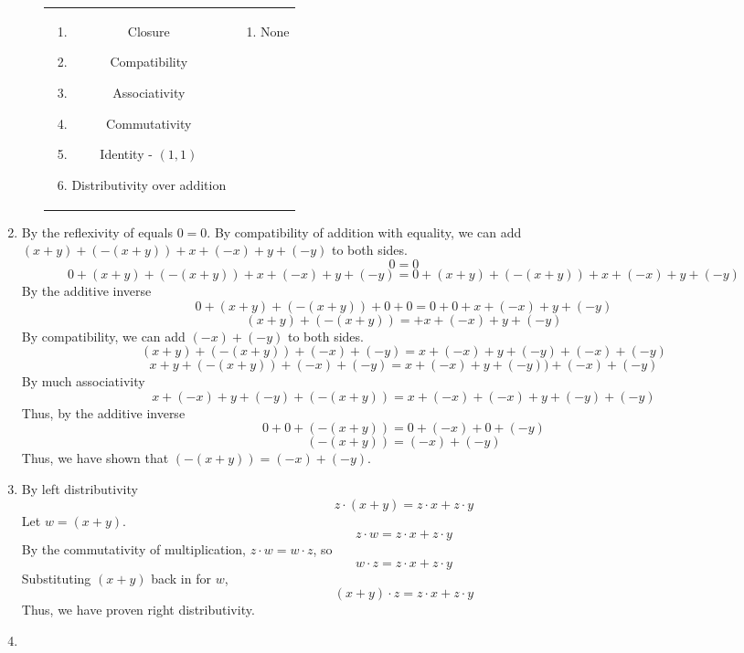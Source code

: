 \documentclass{article}
\begin{document}
\begin{enumerate}[label=\textbf{\arabic*}.]
\begin{enumerate}[label=\textbf{\alph*}.]
\begin{tabular}{c|c}
        \begin{minipage}{0.425\textwidth}
            \begin{enumerate}[label=-, itemsep=-3pt]
                \item Closure
                \item Compatibility
                \item Associativity
                \item Commutativity
                \item Identity - $(1,1)$
                \item Distributivity over addition
            \end{enumerate}
        \end{minipage}
        &
        \begin{minipage}{0.425\textwidth}
            \begin{enumerate}[label=-, itemsep=-3pt]
                \item None
            \end{enumerate}
        \end{minipage}
        \end{tabular}
    \end{enumerate}
    \item 
        By the reflexivity of equals $0=0$. By compatibility of addition with equality, we can add $(x+y)+(-(x+y))+x+(-x)+y+(-y)$ to both sides.
        \[0=0\]
        \[0+(x+y)+(-(x+y))+x+(-x)+y+(-y)=0+(x+y)+(-(x+y))+x+(-x)+y+(-y)\]
        By the additive inverse
        \[0+(x+y)+(-(x+y))+0+0=0+0+x+(-x)+y+(-y)\]
        \[(x+y)+(-(x+y))=+x+(-x)+y+(-y)\]
        By compatibility, we can add $(-x)+(-y)$ to both sides.
        \[(x+y)+(-(x+y))+(-x)+(-y)=x+(-x)+y+(-y)+(-x)+(-y)\]
        \[x+y+(-(x+y))+(-x)+(-y)=x+(-x)+y+(-y))+(-x)+(-y)\]
        By much associativity
        \[x+(-x)+y+(-y)+(-(x+y))=x+(-x)+(-x)+y+(-y)+(-y)\]
        Thus, by the additive inverse
        \[0+0+(-(x+y))=0+(-x)+0+(-y)\]
        \[(-(x+y))=(-x)+(-y)\]
        Thus, we have shown that $(-(x+y))=(-x)+(-y)$.
    \item By left distributivity
        \[z \cdot (x+y)=z \cdot x + z \cdot y\]
        Let $w=(x+y)$.
        \[z \cdot w=z \cdot x + z \cdot y\]
        By the commutativity of multiplication, $z \cdot w = w \cdot z$, so
        \[w \cdot z=z \cdot x + z \cdot y\]
        Substituting $(x+y)$ back in for $w$,
        \[(x+y) \cdot z=z \cdot x + z \cdot y\]
        Thus, we have proven right distributivity.
    \item 

\end{enumerate}
\end{document}
